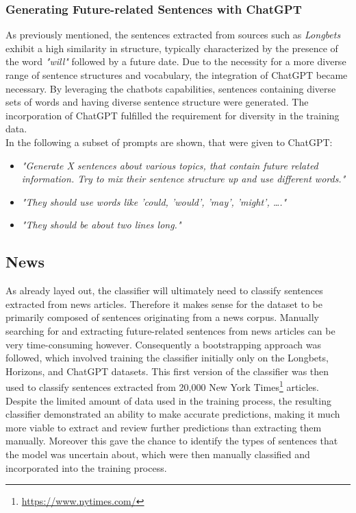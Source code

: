 \documentclass[a4paper,10pt]{report}
\begin{document}
\subsubsection{Generating Future-related Sentences with ChatGPT}
As previously mentioned, the sentences extracted from sources such as \textit{Longbets} exhibit a high similarity in structure, typically characterized by the presence of the word \textit{"will"} followed by a future date. Due to the necessity for a more diverse range of sentence structures and vocabulary, the integration of ChatGPT became necessary. By leveraging the chatbots capabilities, sentences containing diverse sets of words and having diverse sentence structure were generated. The incorporation of ChatGPT fulfilled the requirement for diversity in the training data. \\

In the following a subset of prompts are shown, that were given to ChatGPT:
\begin{itemize}
  \item \textit{"Generate X sentences about various topics, that contain future related information. Try to mix their sentence structure up and use different words."}
  \item \textit{"They should use words like 'could, 'would', 'may', 'might', …."}
  \item \textit{"They should be about two lines long."}
\end{itemize}

\subsection{News}
As already layed out, the classifier will ultimately need to classify sentences extracted from news articles. Therefore it makes sense for the dataset to be primarily composed of sentences originating from a news corpus. Manually searching for and extracting future-related sentences from news articles can be very time-consuming however. Consequently a bootstrapping approach was followed, which involved training the classifier initially only on the Longbets, Horizons, and ChatGPT datasets. This first version of the classifier was then used to classify sentences extracted from 20,000 New York Times\footnote{\url{https://www.nytimes.com/}} articles.
Despite the limited amount of data used in the training process, the resulting classifier demonstrated an ability to make accurate predictions, making it much more viable to extract and review further predictions than extracting them manually. Moreover this gave the chance to identify the types of sentences that the model was uncertain about, which were then manually classified and incorporated into the training process.
\end{document}
